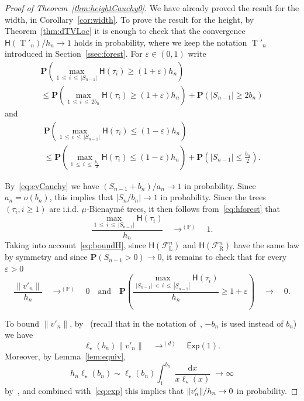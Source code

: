 \documentclass[AHL,Unicode,longabstracts,published]{cedram}
\renewcommand{\P}{\mathbb{P}}
\newcommand{\height}{\mathsf{H}}
\newcommand{\p}{\mathbf{P}}
\newcommand{\sExp}{\mathsf{Exp}}
\DeclareMathOperator{\rtree}{T}
\DeclareMathOperator{\dxseq}{d\mathit{x}}
\DeclareMathOperator{\rmL}{L}
\DeclareMathOperator{\rmR}{R}
\newcommand{\cF}{\mathcal{F}}
\begin{document}
\begin{proof}[Proof of Theorem~\ref{thm:heightCauchy0}] We have already proved the result for the width, in Corollary~\ref{cor:width}. To prove the result for the height, by Theorem~\ref{thm:dTVLoc} it is enough to check that the convergence ${\height(\rtree'_{n})}/{h_{n}} \rightarrow 1$ holds in probability, where we keep the notation $\rtree'_{n}$ introduced in Section~\ref{ssec:forest}. For $\varepsilon \in (0,1)$ write
\begin{multline*}
\p \left(\max_{1\,\leq\,i\,\leq\,|S_{n-1}|}\height(\tau_{i}) \geq (1+\varepsilon) h_{n} \right)\\
\leq \p \left(\max_{1\,\leq\,i\,\leq\,2 b_{n} }\height(\tau_{i}) \geq (1+\varepsilon) h_{n} \right)+\p \left(|S_{n-1}| \geq 2 b_{n} \right)
\end{multline*}
and
\begin{multline*}
\p \left(\max_{1\,\leq\,i\,\leq\,|S_{n-1}|}\height(\tau_{i}) \leq (1-\varepsilon) h_{n} \right)\\
\leq \p \left(\max_{1\,\leq\,i\,\leq\,\frac{ b_{n} }{2}}\height(\tau_{i}) \leq (1-\varepsilon) h_{n} \right)+\p \left(|S_{n-1}| \leq \frac{ b_{n} }{2} \right).
\end{multline*}


By~\eqref{eq:cvCauchy} we have $(S_{n-1}+b_n)/a_{n} \rightarrow 1$ in probability. Since $a_n=o(b_n)$, this implies that $|S_n/b_n| \to 1$ in probability. Since the trees $(\tau_i,i \ge 1)$ are i.i.d. $\mu$-Bienaymé trees, it then follows from~\eqref{eq:hforest} that
\begin{equation}\label{eq:cvproba}
\frac{\max_{1\, \leq\,i\,\leq\,|S_{n-1}|}\height(\tau_{i}) }{h_{n}} \quad \mathop{\longrightarrow}^{(\P)} \quad 1.
\end{equation}
Taking into account~\eqref{eq:boundH}, since $\height(\cF^{n}_{\rmL})$ and $\height(\cF^{n}_{\rmR})$ have the same law by symmetry and since $\p(S_{n-1}>0) \rightarrow 0$, it remains to check that for every $\varepsilon>0$
\begin{equation}\label{eq:rightforest}
\frac{\|v'_n\|}{h_{n}} \quad \mathop{\longrightarrow}^{(\P)} \quad 0 \quad \text{and} \quad \p \left(\frac{\max_{ |S_{n-1}|\,<\,i\,\leq\,|\underline{S}_{n-1}|}\height(\tau_{i})}{h_{n}} \geq 1+\varepsilon \right) \quad \longrightarrow\quad 0.
\end{equation}

To bound $\|v'_n\|$, by~\cite[Theorem~2 and Remark~18]{KR19} (recall that in the notation of~\cite{KR19}, $-b_{n}$ is used instead of $b_{n}$) we have
\begin{equation}\label{eq:exp}
{\ell_{\star}(b_{n})} \|v'_n\| \quad \mathop{\longrightarrow}^{(d)} \quad \sExp(1).
\end{equation}
Moreover, by Lemma~\ref{lem:equiv},
\[
h_{n} {\ell_{\star}(b_{n})} \sim \ell_{\star}(b_{n}) \int_{1}^{ b_{n} } \frac{\dxseq}{x \ell_{\star}(x)} \rightarrow \infty
\]
by~\cite[Proposition~1.5.9b]{BGT89}, and combined with~\eqref{eq:exp} this implies that $\|v'_n\|/h_{n} \linebreak\rightarrow 0$ in probability.


\end{proof}
\end{document}
